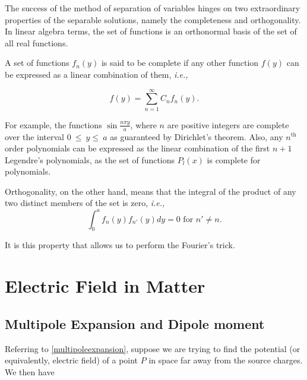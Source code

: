 \documentclass[english,a4paper,12pt]{report}
\begin{document}
The success of the method of separation of variables hinges on two extraordinary properties of the separable solutions, namely the completeness and orthogonality. In linear algebra terms, the set of functions is an orthonormal basis of the set of all real functions.

A set of functions \(f_{n} (y)\) is said to be complete if any other function \(f(y)\) can be expressed as a linear combination of them, \textit{i.e.,} 

\begin{equation}
    f(y) = \sum_{n=1}^{\infty} C_{n} f_{n} (y). 
\end{equation}

For example, the functions \(\sin \frac{n\pi y}{a}\), where \(n\) are positive integers are complete over the interval \(0~\le~y\le~a\) as guaranteed by Dirichlet's theorem. Also, any \(n^{\text{th }} \)  order polynomials can be expressed as the linear combination of the first \(n+1\) Legendre's polynomials, as the set of functions \(P_{l} (x)\) is complete for polynomials.

Orthogonality, on the other hand, means that the integral of the product of any two distinct members of the set is zero, \textit{i.e.,}  
\begin{equation}
    \int_{0}^{a} f_{n} (y) f_{n'} (y) dy = 0 \text { for }  n' \neq n. 
\end{equation}

It is this property that allows us to perform the Fourier's trick.


\chapter{Electric Field in Matter}

\section{Multipole Expansion and Dipole moment}

Referring to \cref{multipoleexpansion}, suppose we are trying to find the potential (or equivalently, electric field) of a point \(P\) in space far away from the source charges. We then have 

\end{document}
